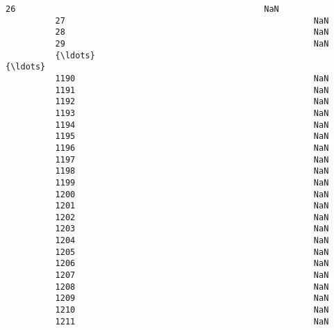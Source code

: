 \documentclass[11pt]{article}
\begin{document}
\begin{Verbatim}[commandchars=\\\{\}]
          26                                                  NaN                               
          27                                                  NaN                               
          28                                                  NaN                               
          29                                                  NaN                               
          {\ldots}                                                 {\ldots}                               
          1190                                                NaN                               
          1191                                                NaN                               
          1192                                                NaN                               
          1193                                                NaN                               
          1194                                                NaN                               
          1195                                                NaN                               
          1196                                                NaN                               
          1197                                                NaN                               
          1198                                                NaN                               
          1199                                                NaN                               
          1200                                                NaN                               
          1201                                                NaN                               
          1202                                                NaN                               
          1203                                                NaN                               
          1204                                                NaN                               
          1205                                                NaN                               
          1206                                                NaN                               
          1207                                                NaN                               
          1208                                                NaN                               
          1209                                                NaN                               
          1210                                                NaN                               
          1211                                                NaN                               

\end{Verbatim}
\end{document}

